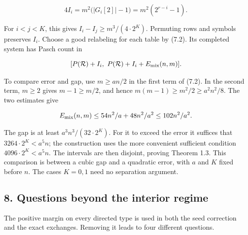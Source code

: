 \documentclass[english,11pt,a4paper]{article}
\begin{document}
\[4I_i=m^2\bigl(|G_i[2]|-1\bigr)=m^2(2^{r-i}-1).\tag{7.3}\]

For \(i<j<K\), this gives \(I_i-I_j\ge m^3/(4\cdot2^K)\). Permuting rows and symbols preserves \(I_i\). Choose a good relabeling for each table by (7.2). Its completed system has Pasch count in

\[[P(\mathcal R)+I_i,\ P(\mathcal R)+I_i+E_{\rm mix}(n,m)].\]

To compare error and gap, use \(m\ge an/2\) in the first term of (7.2). In the second term, \(m\ge2\) gives \(m-1\ge m/2\), and hence \(m(m-1)\ge m^2/2\ge a^2n^2/8\). The two estimates give

\[E_{\rm mix}(n,m)\le54n^2/a+48n^2/a^2\le102n^2/a^2.\]

The gap is at least \(a^3n^3/(32\cdot2^K)\). For it to exceed the error it suffices that \(3264\cdot2^K<a^5n\); the construction uses the more convenient sufficient condition \(4096\cdot2^K<a^5n\). The intervals are then disjoint, proving Theorem 1.3. This comparison is between a cubic gap and a quadratic error, with \(a\) and \(K\) fixed before \(n\). The cases \(K=0,1\) need no separation argument.

\subsection{8. Questions beyond the interior regime}\label{questions-beyond-the-interior-regime}

The positive margin on every directed type is used in both the seed correction and the exact exchanges. Removing it leads to four different questions.
\end{document}
